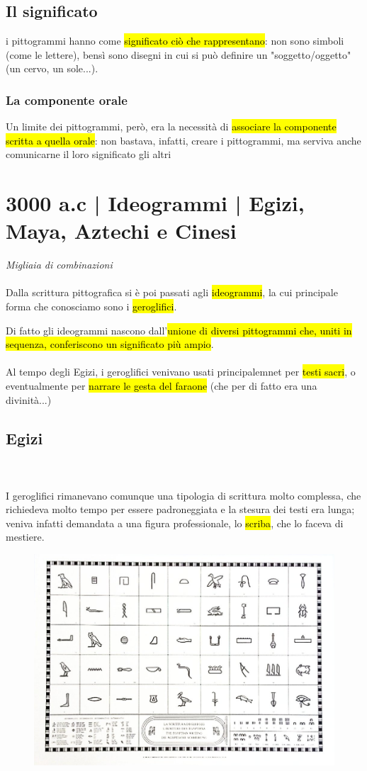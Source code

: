     \subsection{Il significato}
    i pittogrammi hanno come \hl{significato ciò che rappresentano}: non sono simboli (come le lettere), bensì sono disegni in cui si può definire un "soggetto/oggetto" (un cervo, un sole...).
    \subsubsection{La componente orale}
    Un limite dei pittogrammi, però, era la necessità di \hl{associare la componente scritta a quella orale}: non bastava, infatti, creare i pittogrammi, ma serviva anche comunicarne il loro significato gli altri

\section{3000 a.c | Ideogrammi | Egizi, Maya, Aztechi e Cinesi}
{\huge \textit{Migliaia di combinazioni}}\\\\
Dalla scrittura pittografica si è poi passati agli \hl{ideogrammi}, la cui principale forma che conosciamo sono i \hl{geroglifici}.

Di fatto gli ideogrammi nascono dall'\hl{unione di diversi pittogrammi che, uniti in sequenza, conferiscono un significato più ampio}.
\\\\Al tempo degli Egizi, i geroglifici venivano usati principalemnet per \hl{testi sacri}, o eventualmente per \hl{narrare le gesta del faraone} (che per di fatto era una divinità...)

\subsection{Egizi}
\\\\I geroglifici rimanevano comunque una tipologia di scrittura molto complessa, che richiedeva molto tempo per essere padroneggiata e la stesura dei testi era lunga; veniva infatti demandata a una figura professionale, lo \hl{scriba}, che lo faceva di mestiere.

\begin{figure}[H]
    \centering
    \includegraphics[width=0.4\linewidth]{lezione_3/imgs/61Ucl1IMomL.jpg}
\end{figure}

